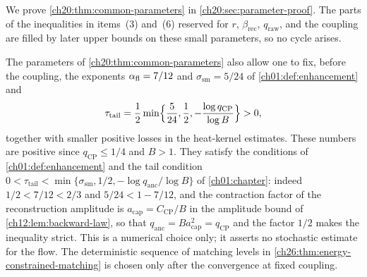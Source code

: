 We prove \cref{ch20:thm:common-parameters} in \cref{ch20:sec:parameter-proof}. The parts of the inequalities in items~(3) and~(6) reserved for $r$, $\beta_{\mathrm{rec}}$, $q_{\mathrm{raw}}$, and the coupling are filled by later upper bounds on these small parameters, so no cycle arises.

\begin{remark}\label{ch20:rem:flow-exponents}
The parameters of \cref{ch20:thm:common-parameters} also allow one to fix, before the coupling, the exponents $\alpha_{\mathrm{fl}}=7/12$ and $\sigma_{\mathrm{sm}}=5/24$ of \cref{ch01:def:enhancement} and
\[
 \tau_{\mathrm{tail}}=\frac12\min\Bigl\{\frac5{24},\frac12,-\frac{\log q_{\mathrm{CP}}}{\log B}\Bigr\}>0,
\]
together with smaller positive losses in the heat-kernel estimates. These numbers are positive since $q_{\mathrm{CP}}\le1/4$ and $B>1$. They satisfy the conditions of \cref{ch01:def:enhancement} and the tail condition $0<\tau_{\mathrm{tail}}<\min\{\sigma_{\mathrm{sm}},1/2,-\log q_{\mathrm{anc}}/\log B\}$ of \cref{ch01:chapter}: indeed $1/2<7/12<2/3$ and $5/24<1-7/12$, and the contraction factor of the reconstruction amplitude is $a_{\mathrm{cap}}=C_{\mathrm{CP}}/B$ in the amplitude bound of \cref{ch12:lem:backward-law}, so that $q_{\mathrm{anc}}=Ba_{\mathrm{cap}}^2=q_{\mathrm{CP}}$ and the factor $1/2$ makes the inequality strict. This is a numerical choice only; it asserts no stochastic estimate for the flow. The deterministic sequence of matching levels in \cref{ch26:thm:energy-constrained-matching} is chosen only after the convergence at fixed coupling.
\end{remark}

